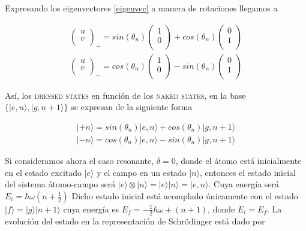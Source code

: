 \documentclass[spanish]{article}
\begin{document}
Expresando los eigenvectores \ref{eigenvec} a manera de rotaciones llegamos a 

\begin{equation}
\begin{split}
\begin{pmatrix}
	u \\
	v \\
\end{pmatrix}_+ = sin(\theta_n)
\begin{pmatrix}
	1 \\
	0 \\
\end{pmatrix} +
cos(\theta_n)
\begin{pmatrix}
	0 \\
	1 \\
\end{pmatrix}
\\
\begin{pmatrix}
	u \\
	v \\
\end{pmatrix}_- = cos(\theta_n)
\begin{pmatrix}
	1 \\
	0 \\
\end{pmatrix} -
sin(\theta_n)
\begin{pmatrix}
	0 \\
	1 \\
\end{pmatrix}\end{split}
\label{eigenvec}
\end{equation}

Así, los \textsc{dressed states} en función de los \textsc{naked states}, en la base $\big\{ |e,n\rangle , |g,n+1\rangle\big\}$ se expresan de la siguiente forma

\begin{equation}
\begin{split}
|+n\rangle = sin(\theta_n)|e,n\rangle + cos(\theta_n)|g,n+1\rangle \\
|-n\rangle = cos(\theta_n)|e,n\rangle - sin(\theta_n)|g,n+1\rangle
\end{split}
\end{equation}







Si consideramos ahora el caso resonante, $\delta = 0$, donde el átomo está inicialmente en el estado excitado $|e\rangle$ y el campo en un estado $|n\rangle$, entonces  el estado inicial del sistema átomo-campo será $|e\rangle \otimes |n\rangle = |e\rangle |n\rangle = |e,n\rangle  $. Cuya energía será $E_i = \hbar \omega (n+\frac{1}{2})$ Dicho estado inicial está acomplado únicamente con el estado $|f\rangle = |g\rangle|n+1\rangle$ cuya energía es $E_f=-\frac{1}{2}\hbar\omega + (n+1)$, donde $E_i=E_f$. La evolución del estado en la representación de Schrödinger está dado por
\end{document}
